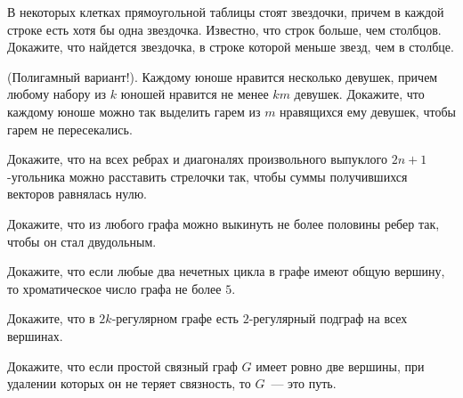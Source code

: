\setcounter{curtask}{1}


\begin{task}
    В некоторых клетках прямоугольной таблицы стоят звездочки, причем в каждой строке
    есть хотя бы одна звездочка. Известно, что строк больше, чем столбцов. Докажите,
    что найдется звездочка, в строке которой меньше звезд, чем в столбце.
\end{task}

\begin{task}
    (Полигамный вариант!).
    Каждому юноше нравится несколько девушек, причем любому набору из $k$ юношей
    нравится не менее $km$ девушек. Докажите, что каждому юноше можно так выделить
    гарем из $m$ нравящихся ему девушек, чтобы гарем не пересекались.
\end{task}

\begin{task}
    Докажите, что на всех ребрах и диагоналях произвольного выпуклого
    $2n + 1$-угольника можно расставить стрелочки так, чтобы суммы получившихся
    векторов равнялась нулю.
\end{task}

\begin{task}
    Докажите, что из любого графа можно выкинуть не более половины ребер так, чтобы
    он стал двудольным.
\end{task}

\begin{task}
    Докажите, что если любые два нечетных цикла в графе имеют общую вершину, то
    хроматическое число графа не более $5$.
\end{task}

\begin{task}
    Докажите, что в $2k$-регулярном графе есть $2$-регулярный подграф на всех вершинах.
\end{task}

\begin{task}
    Докажите, что если простой связный граф $G$ имеет ровно две вершины, при удалении
    которых он не теряет связность, то $G$~--- это путь.
\end{task}
